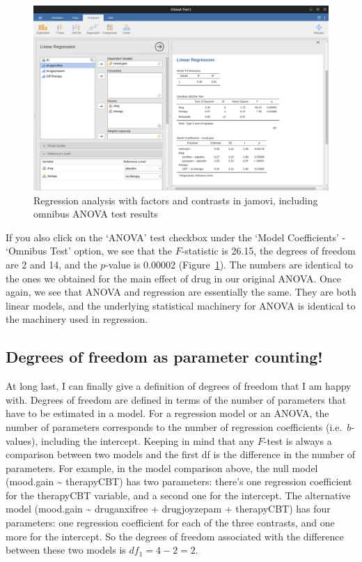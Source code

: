 \documentclass[
  a4paper,
]{book}
\begin{document}
\begin{figure}

\includegraphics[width=1\textwidth,height=\textheight]{images/fig14-23.png} \hfill{}

\caption{\label{fig-fig14-23}Regression analysis with factors and
contrasts in jamovi, including omnibus ANOVA test results}

\end{figure}

If you also click on the `ANOVA' test checkbox under the `Model
Coefficients' - `Omnibus Test' option, we see that the \(F\)-statistic
is 26.15, the degrees of freedom are 2 and 14, and the \(p\)-value is
0.00002 (Figure~\ref{fig-fig14-23}). The numbers are identical to the
ones we obtained for the main effect of drug in our original ANOVA. Once
again, we see that ANOVA and regression are essentially the same. They
are both linear models, and the underlying statistical machinery for
ANOVA is identical to the machinery used in regression.

\hypertarget{degrees-of-freedom-as-parameter-counting}{%
\subsection{Degrees of freedom as parameter
counting!}\label{degrees-of-freedom-as-parameter-counting}}

At long last, I can finally give a definition of degrees of freedom that
I am happy with. Degrees of freedom are defined in terms of the number
of parameters that have to be estimated in a model. For a regression
model or an ANOVA, the number of parameters corresponds to the number of
regression coefficients (i.e.~\(b\)-values), including the intercept.
Keeping in mind that any \(F\)-test is always a comparison between two
models and the first df is the difference in the number of parameters.
For example, in the model comparison above, the null model (mood.gain
\textasciitilde{} therapyCBT) has two parameters: there's one regression
coefficient for the therapyCBT variable, and a second one for the
intercept. The alternative model (mood.gain \textasciitilde{}
druganxifree + drugjoyzepam + therapyCBT) has four parameters: one
regression coefficient for each of the three contrasts, and one more for
the intercept. So the degrees of freedom associated with the difference
between these two models is \(df_1 = 4 - 2 = 2\).
\end{document}
